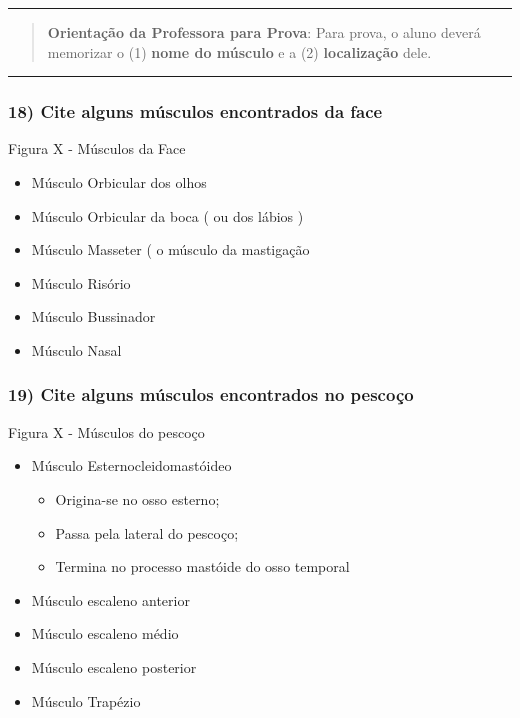 \documentclass[
]{book}
\providecommand{\tightlist}{%
  \setlength{\itemsep}{0pt}\setlength{\parskip}{0pt}}
\begin{document}
\begin{center}\rule{0.5\linewidth}{0.5pt}\end{center}

\begin{quote}
\textbf{Orientação da Professora para Prova}: Para prova, o aluno deverá memorizar o (1) \textbf{nome do músculo} e a (2) \textbf{localização} dele.
\end{quote}

\begin{center}\rule{0.5\linewidth}{0.5pt}\end{center}

\hypertarget{cite-alguns-muxfasculos-encontrados-da-face}{%
\subsubsection*{18) Cite alguns músculos encontrados da face}\label{cite-alguns-muxfasculos-encontrados-da-face}}

Figura X - Músculos da Face

\begin{itemize}
\tightlist
\item
  Músculo Orbicular dos olhos
\item
  Músculo Orbicular da boca ( ou dos lábios )
\item
  Músculo Masseter ( o músculo da mastigação
\item
  Músculo Risório
\item
  Músculo Bussinador
\item
  Músculo Nasal
\end{itemize}

\hypertarget{cite-alguns-muxfasculos-encontrados-no-pescouxe7o}{%
\subsubsection*{19) Cite alguns músculos encontrados no pescoço}\label{cite-alguns-muxfasculos-encontrados-no-pescouxe7o}}

Figura X - Músculos do pescoço

\begin{itemize}
\tightlist
\item
  Músculo Esternocleidomastóideo

  \begin{itemize}
  \tightlist
  \item
    Origina-se no osso esterno;
  \item
    Passa pela lateral do pescoço;
  \item
    Termina no processo mastóide do osso temporal
  \end{itemize}
\item
  Músculo escaleno anterior
\item
  Músculo escaleno médio
\item
  Músculo escaleno posterior
\item
  Músculo Trapézio
\end{itemize}
\end{document}
